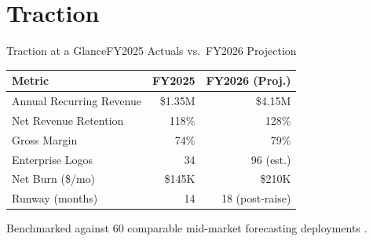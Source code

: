 \section{Traction}

\begin{frame}{Traction at a Glance}{FY2025 Actuals vs.\ FY2026 Projection}

  \centering
  {
  \renewcommand{\arraystretch}{1.35}
  \begin{tabular}{l r r}
    \toprule
    \rowcolor{bgPanel}
    \textcolor{textLight}{\textbf{Metric}} & \textcolor{textLight}{\textbf{FY2025}} & \textcolor{accentMint}{\textbf{FY2026 (Proj.)}} \\
    \midrule
    Annual Recurring Revenue        & \$1.35M       & \$4.15M \\
    \rowcolor{bgPanel}
    Net Revenue Retention           & 118\%         & 128\% \\
    Gross Margin                    & 74\%          & 79\% \\
    \rowcolor{bgPanel}
    Enterprise Logos                & 34            & 96 (est.) \\
    Net Burn (\$/mo)                & \$145K        & \$210K \\
    \rowcolor{bgPanel}
    Runway (months)                 & 14            & 18 (post-raise) \\
    \bottomrule
  \end{tabular}}

  \vspace{0.45cm}
  {\small\textcolor{textMuted}{Benchmarked against 60 comparable mid-market forecasting deployments \cite{synapse2026benchmark}.}}

\end{frame}

